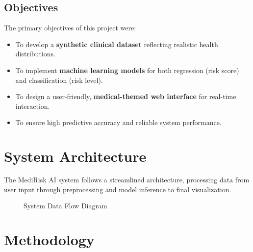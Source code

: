 \documentclass[12pt, a4paper]{article}
\begin{document}
\subsection{Objectives}
The primary objectives of this project were:
\begin{itemize}
    \item To develop a \textbf{synthetic clinical dataset} reflecting realistic health distributions.
    \item To implement \textbf{machine learning models} for both regression (risk score) and classification (risk level).
    \item To design a user-friendly, \textbf{medical-themed web interface} for real-time interaction.
    \item To ensure high predictive accuracy and reliable system performance.
\end{itemize}

\section{System Architecture}
The MediRisk AI system follows a streamlined architecture, processing data from user input through preprocessing and model inference to final visualization.

\begin{figure}[H]
\centering
{}
\caption{System Data Flow Diagram}
\end{figure}

\section{Methodology}
\end{document}
